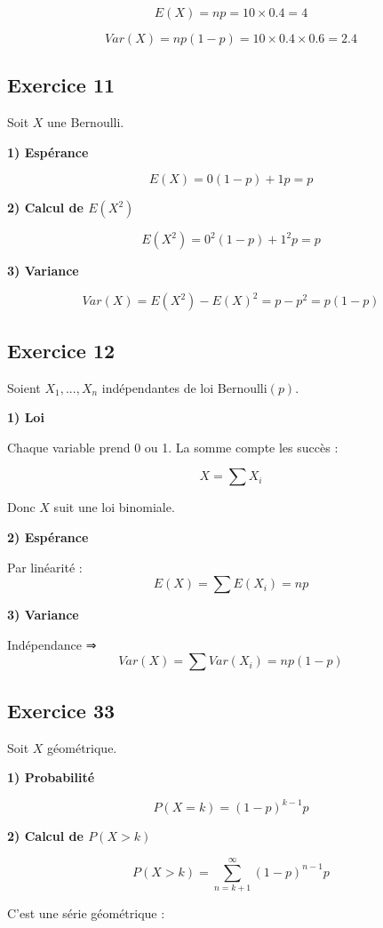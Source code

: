 \documentclass[11pt,a4paper]{article}
\begin{document}
\[
E(X)=np=10 \times 0.4 = 4
\]

\[
Var(X)=np(1-p)=10 \times 0.4 \times 0.6 = 2.4
\]

\subsection*{Exercice 11}

Soit $X$ une Bernoulli.

\textbf{1) Espérance}

\[
E(X)=0(1-p)+1p = p
\]

\textbf{2) Calcul de $E(X^2)$}

\[
E(X^2)=0^2(1-p)+1^2 p = p
\]

\textbf{3) Variance}

\[
Var(X)=E(X^2)-E(X)^2 = p - p^2 = p(1-p)
\]

\subsection*{Exercice 12}

Soient $X_1,...,X_n$ indépendantes de loi Bernoulli$(p)$.

\textbf{1) Loi}

Chaque variable prend 0 ou 1. La somme compte les succès :

\[
X = \sum X_i
\]

Donc $X$ suit une loi binomiale.

\textbf{2) Espérance}

Par linéarité :
\[
E(X)=\sum E(X_i)=np
\]

\textbf{3) Variance}

Indépendance ⇒
\[
Var(X)=\sum Var(X_i)=np(1-p)
\]

\subsection*{Exercice 33}

Soit $X$ géométrique.

\textbf{1) Probabilité}

\[
P(X=k)=(1-p)^{k-1}p
\]

\textbf{2) Calcul de $P(X>k)$}

\[
P(X>k)=\sum_{n=k+1}^{\infty}(1-p)^{n-1}p
\]

C’est une série géométrique :
\end{document}
